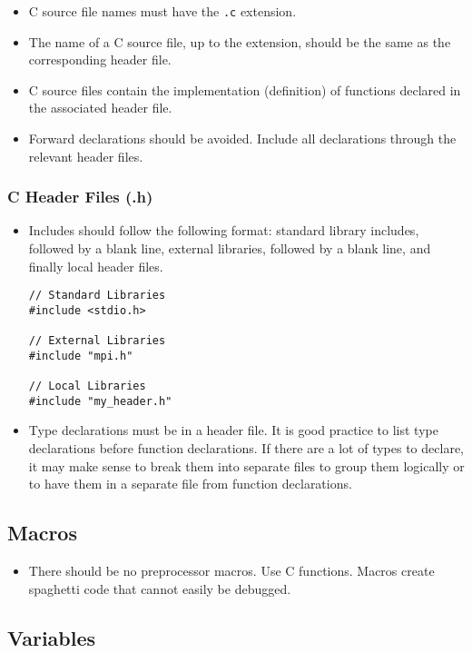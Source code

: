 \begin{itemize}
    \item C source file names must have the \texttt{.c} extension.
    \item The name of a C source file, up to the extension, should be the same as the corresponding header file.
    \item C source files contain the implementation (definition) of functions declared in the associated header file.
    \item Forward declarations should be avoided.  Include all declarations through the relevant header files.
\end{itemize}

\subsubsection{C Header Files (.h)}
\begin{itemize}
    \item Includes should follow the following format: standard library includes, followed by a blank line, external libraries, followed by a blank line, and finally local header files.
        \begin{verbatim}
// Standard Libraries
#include <stdio.h>

// External Libraries
#include "mpi.h"

// Local Libraries
#include "my_header.h"
        \end{verbatim}

    \item Type declarations must be in a header file.  It is good practice to list type declarations before function declarations.  If there are a lot of types to declare, it may make sense to break them into separate files to group them logically or to have them in a separate file from function declarations.
\end{itemize}

\subsection{Macros}

\begin{itemize}
    \item There should be no preprocessor macros.  Use C functions. Macros create spaghetti code that cannot easily be debugged.
\end{itemize}

\subsection{Variables}

